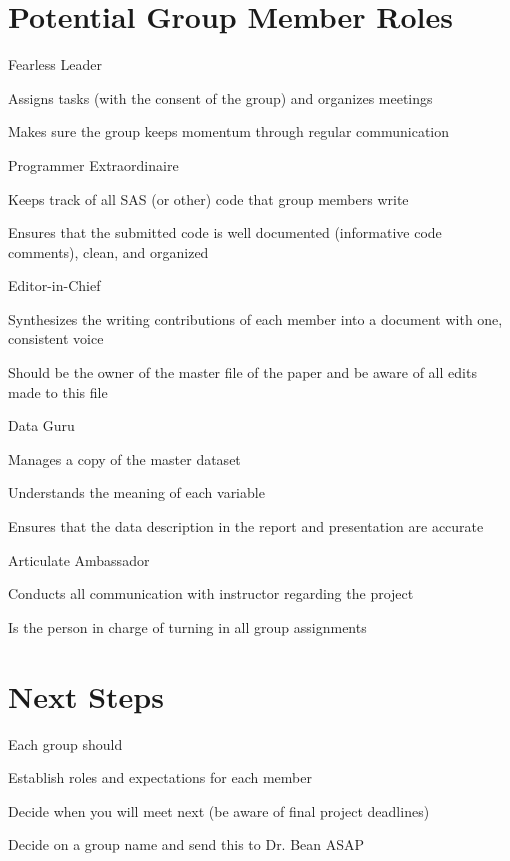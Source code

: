\documentclass[12pt]{notes}
\begin{document}
\section{Potential Group Member Roles}
\bi
\item Fearless Leader
\bi
\item Assigns tasks (with the consent of the group) and organizes meetings
\item Makes sure the group keeps momentum through regular communication
\ei
\item Programmer Extraordinaire
\bi
\item Keeps track of all SAS (or other) code that group members write
\item Ensures that the submitted code is well documented (informative code comments), clean, and organized
\ei
\item Editor-in-Chief
\bi
\item Synthesizes the writing contributions of each member into a document with one, consistent voice
\item Should be the owner of the master file of the paper and be aware of all edits made to this file
\ei
\item Data Guru
\bi
\item Manages a copy of the master dataset
\item Understands the meaning of each variable
\item Ensures that the data description in the report and presentation are accurate
\ei
\item Articulate Ambassador
\bi
\item Conducts all communication with instructor regarding the project
\item Is the person in charge of turning in all group assignments
\ei
\ei

\section{Next Steps}
Each group should
\bi
\item Establish roles and expectations for each member
\item Decide when you will meet next (be aware of final project deadlines)
\item Decide on a group name and send this to Dr. Bean ASAP
\ei
\end{document}
